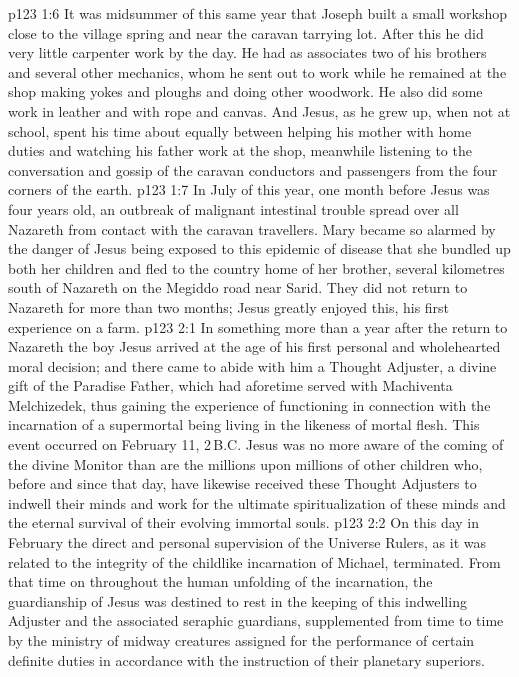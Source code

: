 \vs p123 1:6 It was midsummer of this same year that Joseph built a small workshop close to the village spring and near the caravan tarrying lot. After this he did very little carpenter work by the day. He had as associates two of his brothers and several other mechanics, whom he sent out to work while he remained at the shop making yokes and ploughs and doing other woodwork. He also did some work in leather and with rope and canvas. And Jesus, as he grew up, when not at school, spent his time about equally between helping his mother with home duties and watching his father work at the shop, meanwhile listening to the conversation and gossip of the caravan conductors and passengers from the four corners of the earth.
\vs p123 1:7 In July of this year, one month before Jesus was four years old, an outbreak of malignant intestinal trouble spread over all Nazareth from contact with the caravan travellers. Mary became so alarmed by the danger of Jesus being exposed to this epidemic of disease that she bundled up both her children and fled to the country home of her brother, several kilometres south of Nazareth on the Megiddo road near Sarid. They did not return to Nazareth for more than two months; Jesus greatly enjoyed this, his first experience on a farm.
\vs p123 2:1 In something more than a year after the return to Nazareth the boy Jesus arrived at the age of his first personal and wholehearted moral decision; and there came to abide with him a Thought Adjuster, a divine gift of the Paradise Father, which had aforetime served with Machiventa Melchizedek, thus gaining the experience of functioning in connection with the incarnation of a supermortal being living in the likeness of mortal flesh. This event occurred on February 11, 2\,B.C. Jesus was no more aware of the coming of the divine Monitor than are the millions upon millions of other children who, before and since that day, have likewise received these Thought Adjusters to indwell their minds and work for the ultimate spiritualization of these minds and the eternal survival of their evolving immortal souls.
\vs p123 2:2 On this day in February the direct and personal supervision of the Universe Rulers, as it was related to the integrity of the childlike incarnation of Michael, terminated. From that time on throughout the human unfolding of the incarnation, the guardianship of Jesus was destined to rest in the keeping of this indwelling Adjuster and the associated seraphic guardians, supplemented from time to time by the ministry of midway creatures assigned for the performance of certain definite duties in accordance with the instruction of their planetary superiors.
